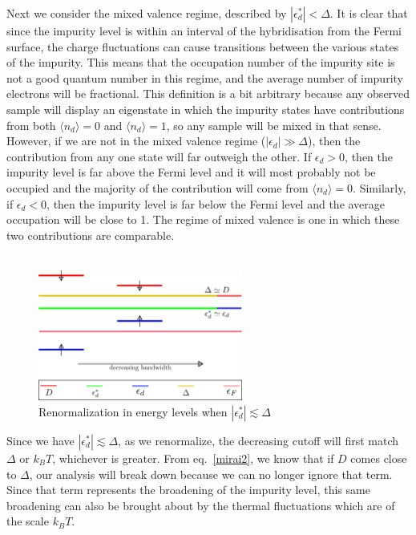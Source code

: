 Next we consider the mixed valence regime, described by \(|\epsilon_d^*| < \Delta\).
It is clear that since the impurity level is within an interval of the hybridisation from the Fermi surface, the charge fluctuations can cause transitions between the various states of the impurity.
This means that the occupation number of the impurity site is not a good quantum number in this regime, and the average number of impurity electrons will be fractional.
This definition is a bit arbitrary because any observed sample will display an eigenstate in which the impurity states have contributions from both \(\langle  n_d\rangle=0\) and \(\langle  n_d\rangle=1\), so any sample will be mixed in that sense.
However, if we are not in the mixed valence regime (\(|\epsilon_d| \gg \Delta\)), then the contribution from any one state will far outweigh the other.
If \(\epsilon_d > 0\), then the impurity level is far above the Fermi level and it will most probably not be occupied and the majority of the contribution will come from \(\langle  n_d\rangle = 0\).
Similarly, if \(\epsilon_d < 0\), then the impurity level is far below the Fermi level and the average occupation will be close to 1.
The regime of mixed valence is one in which these two contributions are comparable.
\\\\
\begin{figure}
	\centering
	\includegraphics[width=0.6\textwidth]{../figures/mixed.png}
	\caption{Renormalization in energy levels when \(|\epsilon_d^*| \lesssim \Delta\)}
\end{figure}
Since we have \(|\epsilon_d^*| \lesssim \Delta\), as we renormalize, the decreasing cutoff will first match \(\Delta\) or \(k_B T\), whichever is greater.
From eq.~\ref{mirai2}, we know that if \(D\) comes close to \(\Delta\), our analysis will break down because we can no longer ignore that term.
Since that term represents the broadening of the impurity level, this same broadening can also be brought about by the thermal fluctuations which are of the scale \(k_B T\).
